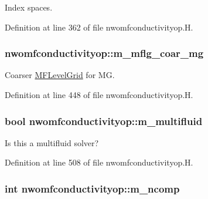 Index spaces. 



Definition at line 362 of file nwomfconductivityop.\+H.

\subsubsection[{\texorpdfstring{m\+\_\+mflg\+\_\+coar\+\_\+mg}{m_mflg_coar_mg}}]{ nwomfconductivityop\+::m\+\_\+mflg\+\_\+coar\+\_\+mg\hspace{0.3cm}{\ttfamily [protected]}}\hypertarget{classnwomfconductivityop_af7c39316fba3146e24103e340836afa0}{}\label{classnwomfconductivityop_af7c39316fba3146e24103e340836afa0}


Coarser \hyperlink{classMFLevelGrid}{M\+F\+Level\+Grid} for MG. 



Definition at line 448 of file nwomfconductivityop.\+H.

\subsubsection[{\texorpdfstring{m\+\_\+multifluid}{m_multifluid}}]{\setlength{\rightskip}{0pt plus 5cm}bool nwomfconductivityop\+::m\+\_\+multifluid\hspace{0.3cm}{\ttfamily [protected]}}\hypertarget{classnwomfconductivityop_a9082df3aa4ce17ad08b929dd7c9ca4dc}{}\label{classnwomfconductivityop_a9082df3aa4ce17ad08b929dd7c9ca4dc}


Is this a multifluid solver? 



Definition at line 508 of file nwomfconductivityop.\+H.

\subsubsection[{\texorpdfstring{m\+\_\+ncomp}{m_ncomp}}]{\setlength{\rightskip}{0pt plus 5cm}int nwomfconductivityop\+::m\+\_\+ncomp\hspace{0.3cm}{\ttfamily [protected]}}\hypertarget{classnwomfconductivityop_a199f8baac17dbcc13ea649c6bde933b3}{}\label{classnwomfconductivityop_a199f8baac17dbcc13ea649c6bde933b3}


